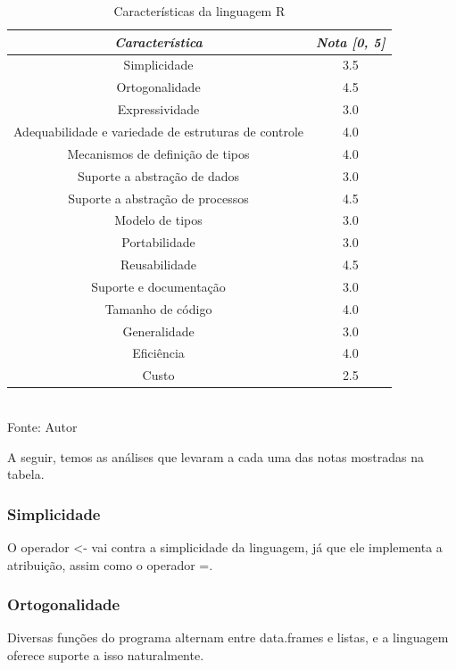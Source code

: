\documentclass[rel_mlp]{iiufrgs}
\newcommand{\fonte}[1]{\\Fonte: {#1}}
\begin{document}
\begin{table}[ht]
  \caption{Características da linguagem R}
  \centering
    \begin{tabular}{ c | c }
        \hline
        \textit{Característica} &
        \textit{Nota [0, 5]} \\
        \hline
        Simplicidade & 3.5\\
        \hline
        Ortogonalidade & 4.5\\
        \hline
        Expressividade & 3.0\\
        \hline
        Adequabilidade e variedade de estruturas de controle & 4.0\\
        \hline
        Mecanismos de definição de tipos & 4.0\\
        \hline
        Suporte a abstração de dados & 3.0\\
        \hline
        Suporte a abstração de processos & 4.5\\
        \hline
        Modelo de tipos & 3.0\\
        \hline
        Portabilidade & 3.0\\
        \hline
        Reusabilidade & 4.5\\
        \hline
        Suporte e documentação & 3.0\\
        \hline
        Tamanho de código & 4.0\\
        \hline
        Generalidade & 3.0\\
        \hline
        Eficiência & 4.0\\
        \hline
        Custo & 2.5\\
      \hline
    \end{tabular}
     \fonte{Autor}
  \label{tab:caracteristicas}
\end{table}

A seguir, temos as análises que levaram a cada uma das notas mostradas na tabela.

\subsubsection{Simplicidade}
O operador <- vai contra a simplicidade da linguagem, já que ele implementa a atribuição, assim como o operador =.

\subsubsection{Ortogonalidade}
Diversas funções do programa alternam entre data.frames e listas, e a linguagem oferece suporte a isso naturalmente.
\end{document}
